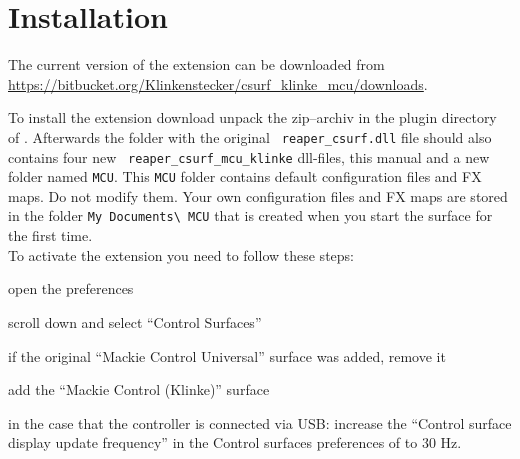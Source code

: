 \section{Installation}\label{installation} 

The current version of the extension can be downloaded from
\url{https://bitbucket.org/Klinkenstecker/csurf\_klinke\_mcu/downloads}.

To install the extension download unpack the zip--archiv in the plugin
directory of \reaper. Afterwards the folder with the original {\tt
  reaper\_csurf.dll} file should also contains four new {\tt
  reaper\_csurf\_mcu\_klinke} dll-files, this manual and a new folder
named {\tt MCU}. This {\tt MCU} folder contains default configuration
files and FX maps. Do not modify them. Your own configuration files
and FX maps are stored in the folder {\tt My Documents\textbackslash
  MCU} that is created when you start the
\mcu surface for the first time.\\

\noindent
To activate the extension you need to follow these steps:
\begin{compactitem}
\item open the \reaper preferences
\item scroll down and select ``Control Surfaces'' 
\item if the original ``Mackie Control Universal'' surface was added, remove it
\item add the ``Mackie Control (Klinke)'' surface
\item in the case that the controller is connected via USB: increase
  the ``Control surface display update frequency'' in the Control
  surfaces preferences of \reaper to 30 Hz.  
\end{compactitem}


